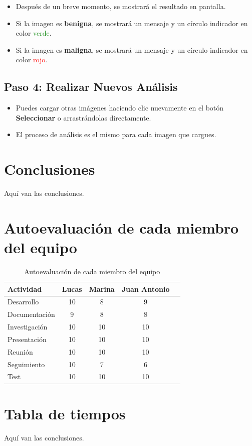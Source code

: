 \documentclass[12pt]{article} %
\begin{document}
\begin{itemize}
    \item Después de un breve momento, se mostrará el resultado en pantalla.
    \item Si la imagen es \textbf{benigna}, se mostrará un mensaje y un círculo indicador en color \textcolor{green}{verde}.
    \item Si la imagen es \textbf{maligna}, se mostrará un mensaje y un círculo indicador en color \textcolor{red}{rojo}.
\end{itemize}

\subsection*{Paso 4: Realizar Nuevos Análisis}

\begin{itemize}
    \item Puedes cargar otras imágenes haciendo clic nuevamente en el botón \textbf{Seleccionar} o arrastrándolas directamente.
    \item El proceso de análisis es el mismo para cada imagen que cargues.
\end{itemize}


\section{Conclusiones}
Aquí van las conclusiones.

\section{Autoevaluación de cada miembro del equipo}
\renewcommand{\tablename}{Tabla}

\begin{table}[h]
    \centering
    \renewcommand{\arraystretch}{1.5}
    \setlength{\arrayrulewidth}{0.8pt}
    \begin{tabular}{lcccc}
    \toprule
    \rowcolor{gray!30} %
    \textbf{Actividad} & \textbf{Lucas} & \textbf{Marina} & \textbf{Juan Antonio} \\
    \midrule
    Desarrollo & 10 & 8 & 9 \\
    Documentación & 9 & 8 & 8 \\
    Investigación & 10 & 10 & 10 \\
    Presentación & 10 & 10 & 10 \\
    Reunión & 10 & 10 & 10 \\
    Seguimiento & 10 & 7 & 6 \\
    Test & 10 & 10 & 10 \\
    \bottomrule
    \end{tabular}
    \caption{Autoevaluación de cada miembro del equipo}
    \label{tab:evaluacion}
\end{table}


\section{Tabla de tiempos}
Aquí van las conclusiones.

\printbibliography
\end{document}
